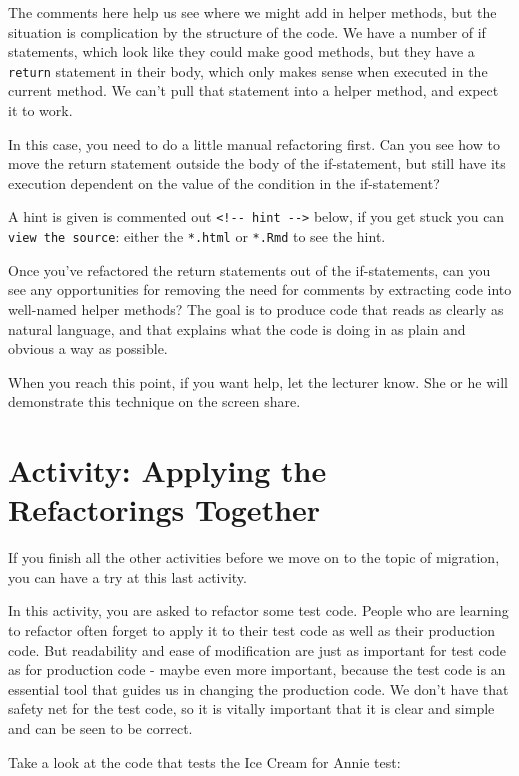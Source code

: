 \documentclass[
]{book}
\begin{document}
The comments here help us see where we might add in helper methods, but the situation is complication by the structure of the code. We have a number of if statements, which look like they could make good methods, but they have a \texttt{return} statement in their body, which only makes sense when executed in the current method. We can't pull that statement into a helper method, and expect it to work.

In this case, you need to do a little manual refactoring first. Can you see how to move the return statement outside the body of the if-statement, but still have its execution dependent on the value of the condition in the if-statement?

A hint is given is commented out \texttt{\textless{}!-\/-\ hint\ -\/-\textgreater{}} below, if you get stuck you can \texttt{view\ the\ source}: either the \texttt{*.html} or \texttt{*.Rmd} to see the hint.

Once you've refactored the return statements out of the if-statements, can you see any opportunities for removing the need for comments by extracting code into well-named helper methods? The goal is to produce code that reads as clearly as natural language, and that explains what the code is doing in as plain and obvious a way as possible.

When you reach this point, if you want help, let the lecturer know. She or he will demonstrate this technique on the screen share.

\hypertarget{refactorings}{%
\section{Activity: Applying the Refactorings Together}\label{refactorings}}

If you finish all the other activities before we move on to the topic of migration, you can have a try at this last activity.

In this activity, you are asked to refactor some test code. People who are learning to refactor often forget to apply it to their test code as well as their production code. But readability and ease of modification are just as important for test code as for production code - maybe even more important, because the test code is an essential tool that guides us in changing the production code. We don't have that safety net for the test code, so it is vitally important that it is clear and simple and can be seen to be correct.

Take a look at the code that tests the Ice Cream for Annie test:
\end{document}
